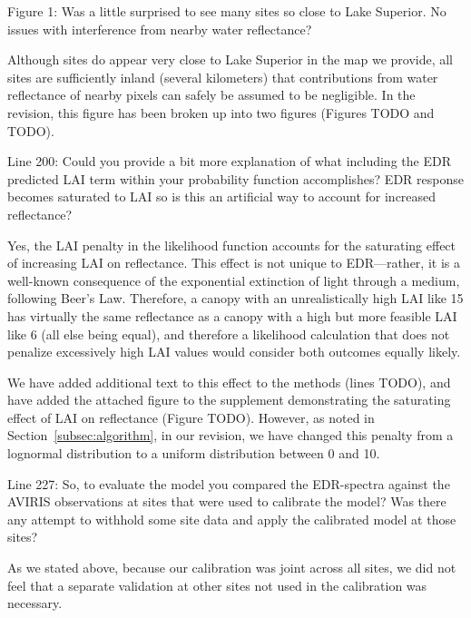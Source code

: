 \begin{reviewer}
  Figure 1: Was a little surprised to see many sites so close to Lake Superior. No issues with interference from nearby water reflectance?
\end{reviewer}

Although sites do appear very close to Lake Superior in the map we provide, all sites are sufficiently inland (several kilometers) that contributions from water reflectance of nearby pixels can safely be assumed to be negligible.
In the revision, this figure has been broken up into two figures (Figures TODO and TODO).

\begin{reviewer}
  Line 200: Could you provide a bit more explanation of what including the EDR predicted LAI term within your probability function accomplishes? EDR response becomes saturated to LAI so is this an artificial way to account for increased reflectance?
\end{reviewer}

Yes, the LAI penalty in the likelihood function accounts for the saturating effect of increasing LAI on reflectance.
This effect is not unique to EDR---rather, it is a well-known consequence of the exponential extinction of light through a medium, following Beer’s Law.
Therefore, a canopy with an unrealistically high LAI like 15 has virtually the same reflectance as a canopy with a high but more feasible LAI like 6 (all else being equal),
and therefore a likelihood calculation that does not penalize excessively high LAI values would consider both outcomes equally likely.

We have added additional text to this effect to the methods (lines TODO), and have added the attached figure to the supplement demonstrating the saturating effect of LAI on reflectance (Figure TODO).
However, as noted in Section~\ref{subsec:algorithm}, in our revision, we have changed this penalty from a lognormal distribution to a uniform distribution between 0 and 10.

\begin{reviewer}
  Line 227: So, to evaluate the model you compared the EDR-spectra against the AVIRIS observations at sites that were used to calibrate the model? Was there any attempt to withhold some site data and apply the calibrated model at those sites?
\end{reviewer}

As we stated above, because our calibration was joint across all sites, we did not feel that a separate validation at other sites not used in the calibration was necessary.


